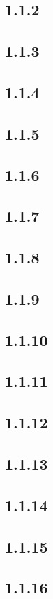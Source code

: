 \documentclass[11pt]{article}
\begin{document}
	\subsection*{1.1.2}
	\subsection*{1.1.3}
	\subsection*{1.1.4}
	\subsection*{1.1.5}
	\subsection*{1.1.6}
	\subsection*{1.1.7}
	\subsection*{1.1.8}
	\subsection*{1.1.9}
	\subsection*{1.1.10}
	\subsection*{1.1.11}
	\subsection*{1.1.12}
	\subsection*{1.1.13}
	\subsection*{1.1.14}
	\subsection*{1.1.15}
	\subsection*{1.1.16}
\end{document}
